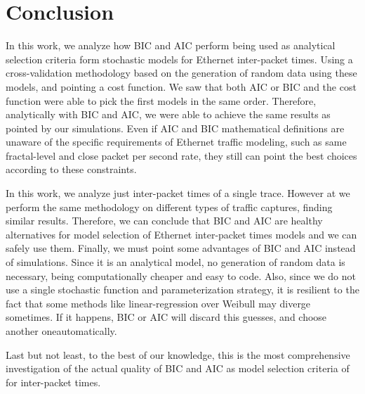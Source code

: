 

\section{Conclusion}

In this work, we analyze how BIC and AIC perform being used as analytical selection criteria form stochastic models for Ethernet inter-packet times. Using a cross-validation methodology based on the generation of random data using these models, and pointing a cost function. We saw that both AIC or BIC and the cost function were able to pick the first models in the same order. Therefore, analytically with BIC and AIC, we were able to achieve the same results as pointed by our simulations. Even if AIC and BIC mathematical definitions are unaware of the specific requirements of Ethernet traffic modeling, such as same fractal-level and close packet per second rate, they still can point the best choices according to these constraints. 

In this work, we analyze just inter-packet times of a single trace. However at \cite{projeto-github} we perform the same methodology on different types of traffic captures, finding similar results. Therefore, we can conclude that BIC and AIC are healthy alternatives for model selection of Ethernet inter-packet times models and we can safely use them. Finally, we must point some advantages of BIC and AIC instead of simulations. Since it is an analytical model, no generation of random data is necessary,  being computationally cheaper and easy to code. Also, since we do not use a single stochastic function and parameterization strategy, it is resilient to the fact that some methods like linear-regression over Weibull may diverge sometimes. If it happens, BIC or AIC will discard this guesses, and choose another oneautomatically.

Last but not least, to the best of our knowledge, this is the most comprehensive investigation of the actual quality of BIC and AIC as model selection criteria of for inter-packet times.

